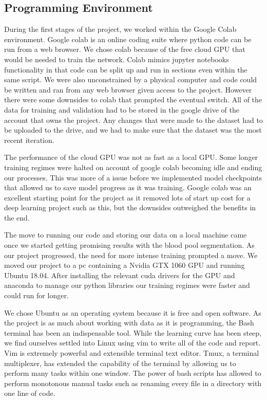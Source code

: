 \documentclass[12pt]{article}
\begin{document}
\subsection{Programming Environment}
During the first stages of the project, we worked within the Google Colab environment.
Google colab is an online coding suite where python code can be run from a web browser.
We chose colab because of the free cloud GPU that would be needed to train the network.
Colab mimics jupyter notebooks functionality in that code can be split up and run in sections even within the same script.
We were also unconstrained by a physical computer and code could be written and ran from any web browser given access to the project.
However there were some downsides to colab that prompted the eventual switch.
All of the data for training and validation had to be stored in the google drive of the account that owns the project.
Any changes that were made to the dataset had to be uploaded to the drive, and we had to make sure that the dataset was the most recent iteration.
\par 
The performance of the cloud GPU was not as fast as a local GPU.
Some longer training regimes were halted on account of google colab becoming idle and ending our processes.
This was more of a issue before we implemented model checkpoints that allowed us to save model progress as it was training.
Google colab was an excellent starting point for the project as it removed lots of start up cost for a deep learning project such as this, but the downsides outweighed the benefits in the end.

The move to running our code and storing our data on a local machine came once we started getting promising results with the blood pool segmentation.
As our project progressed, the need for more intense training prompted a move.
We moved our project to a pc containing a Nvidia GTX 1060 GPU and running Ubuntu 18.04.
After installing the relevant cuda drivers for the GPU and anaconda to manage our python libraries our training regimes were faster and could run for longer.

We chose Ubuntu as an operating system because it is free and open software.
As the project is as much about working with data as it is programming, the Bash terminal has been an indispensable tool.
While the learning curve has been steep, we find ourselves settled into Linux using vim to write all of the code and report.
Vim is extremely powerful and extensible terminal text editor.
Tmux, a terminal multiplexer, has extended the capability of the terminal by allowing us to perform many tasks within one window.
The power of bash scripts has allowed to perform monotonous manual tasks such as renaming every file in a directory with one line of code.
\end{document}
